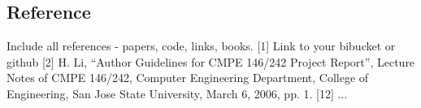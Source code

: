 \documentclass{article}
\begin{document}
\begin{multicols}{2}
\section{Reference}
Include all references - papers, code, links, books.
[1] Link to your bibucket or github
[2] H. Li,  “Author Guidelines for CMPE 146/242 Project Report”, Lecture Notes of CMPE 146/242, Computer Engineering Department, College of Engineering, San Jose State University, March 6, 2006, pp. 1.
[12] ...






\end{multicols}
\end{document}
